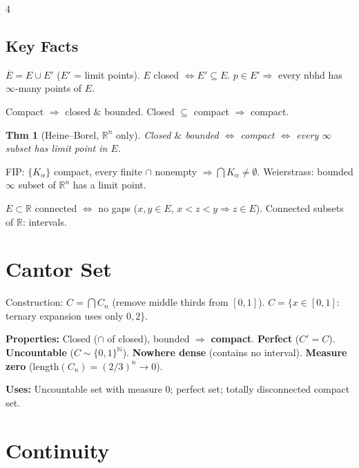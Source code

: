 \documentclass[9pt,landscape]{extarticle}
\newcommand{\R}{\mathbb{R}}
\newcommand{\N}{\mathbb{N}}
\theoremstyle{compact}
\newtheorem*{thm}{Thm}
\theoremstyle{defnstyle}
\begin{document}
\begin{multicols}{4}
\subsection{Key Facts}
$\overline{E} = E \cup E'$ ($E'$ = limit points). $E$ closed $\Leftrightarrow E' \subseteq E$. $p \in E' \Rightarrow$ every nbhd has $\infty$-many points of $E$.

Compact $\Rightarrow$ closed $\&$ bounded. Closed $\subseteq$ compact $\Rightarrow$ compact.

\begin{highlight}
\begin{thm}[Heine--Borel, $\R^n$ only]
Closed $\&$ bounded $\Leftrightarrow$ compact $\Leftrightarrow$ every $\infty$ subset has limit point in $E$.
\end{thm}
\end{highlight}

FIP: $\{K_\alpha\}$ compact, every finite $\cap$ nonempty $\Rightarrow \bigcap K_\alpha \neq \emptyset$. Weierstrass: bounded $\infty$ subset of $\R^n$ has a limit point.

$E \subset \R$ connected $\Leftrightarrow$ no gaps ($x,y\in E$, $x<z<y \Rightarrow z\in E$). Connected subsets of $\R$: intervals.

\section{Cantor Set}

Construction: $C = \bigcap C_n$ (remove middle thirds from $[0,1]$). $C = \{x \in [0,1] : $ ternary expansion uses only $0, 2\}$.

\textbf{Properties:} Closed ($\cap$ of closed), bounded $\Rightarrow$ \textbf{compact}. \textbf{Perfect} ($C'=C$). \textbf{Uncountable} ($C \sim \{0,1\}^\N$). \textbf{Nowhere dense} (contains no interval). \textbf{Measure zero} (length$(C_n) = (2/3)^n \to 0$).

\textbf{Uses:} Uncountable set with measure $0$; perfect set; totally disconnected compact set.

\section{Continuity}


\end{multicols}
\end{document}

